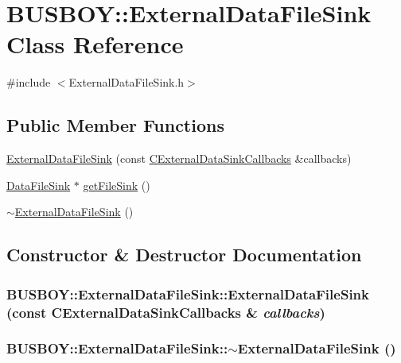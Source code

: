 \hypertarget{classBUSBOY_1_1ExternalDataFileSink}{
\section{BUSBOY::ExternalDataFileSink Class Reference}
\label{classBUSBOY_1_1ExternalDataFileSink}
}


{\ttfamily \#include $<$ExternalDataFileSink.h$>$}\subsection*{Public Member Functions}
\begin{DoxyCompactItemize}
\item 
\hyperlink{classBUSBOY_1_1ExternalDataFileSink_adf0dcac329bf3fba62c361038f9535cc}{ExternalDataFileSink} (const \hyperlink{structCExternalDataSinkCallbacksStruct}{CExternalDataSinkCallbacks} \&callbacks)
\item 
\hyperlink{classBUSBOY_1_1DataFileSink}{DataFileSink} $\ast$ \hyperlink{classBUSBOY_1_1ExternalDataFileSink_aa6e477790be9a62bf2ffa4d8d2894a2c}{getFileSink} ()
\item 
\hyperlink{classBUSBOY_1_1ExternalDataFileSink_af17ad066abf6699daeb1e9319c13bb06}{$\sim$ExternalDataFileSink} ()
\end{DoxyCompactItemize}


\subsection{Constructor \& Destructor Documentation}
\hypertarget{classBUSBOY_1_1ExternalDataFileSink_adf0dcac329bf3fba62c361038f9535cc}{
\subsubsection[{ExternalDataFileSink}]{\setlength{\rightskip}{0pt plus 5cm}BUSBOY::ExternalDataFileSink::ExternalDataFileSink (const {\bf CExternalDataSinkCallbacks} \& {\em callbacks})}}
\label{classBUSBOY_1_1ExternalDataFileSink_adf0dcac329bf3fba62c361038f9535cc}
\hypertarget{classBUSBOY_1_1ExternalDataFileSink_af17ad066abf6699daeb1e9319c13bb06}{
\subsubsection[{$\sim$ExternalDataFileSink}]{\setlength{\rightskip}{0pt plus 5cm}BUSBOY::ExternalDataFileSink::$\sim$ExternalDataFileSink ()}}
\label{classBUSBOY_1_1ExternalDataFileSink_af17ad066abf6699daeb1e9319c13bb06}


